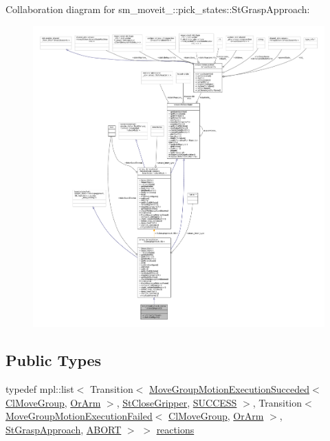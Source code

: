 Collaboration diagram for sm\+\_\+moveit\+\_\+:\+:pick\+\_\+states\+:\+:St\+Grasp\+Approach\+:
\nopagebreak
\begin{figure}[H]
\begin{center}
\leavevmode
\includegraphics[width=350pt]{structsm__moveit__2_1_1pick__states_1_1StGraspApproach__coll__graph}
\end{center}
\end{figure}
\subsection*{Public Types}
\begin{DoxyCompactItemize}
\item 
typedef mpl\+::list$<$ Transition$<$ \hyperlink{structmoveit__z__client_1_1MoveGroupMotionExecutionSucceded}{Move\+Group\+Motion\+Execution\+Succeded}$<$ \hyperlink{classmoveit__z__client_1_1ClMoveGroup}{Cl\+Move\+Group}, \hyperlink{classsm__moveit__2_1_1OrArm}{Or\+Arm} $>$, \hyperlink{structsm__moveit__2_1_1pick__states_1_1StCloseGripper}{St\+Close\+Gripper}, \hyperlink{classSUCCESS}{S\+U\+C\+C\+E\+SS} $>$, Transition$<$ \hyperlink{structmoveit__z__client_1_1MoveGroupMotionExecutionFailed}{Move\+Group\+Motion\+Execution\+Failed}$<$ \hyperlink{classmoveit__z__client_1_1ClMoveGroup}{Cl\+Move\+Group}, \hyperlink{classsm__moveit__2_1_1OrArm}{Or\+Arm} $>$, \hyperlink{structsm__moveit__2_1_1pick__states_1_1StGraspApproach}{St\+Grasp\+Approach}, \hyperlink{classABORT}{A\+B\+O\+RT} $>$ $>$ \hyperlink{structsm__moveit__2_1_1pick__states_1_1StGraspApproach_a196015ebae8ff30eddaab5b5a2d48711}{reactions}
\end{DoxyCompactItemize}
